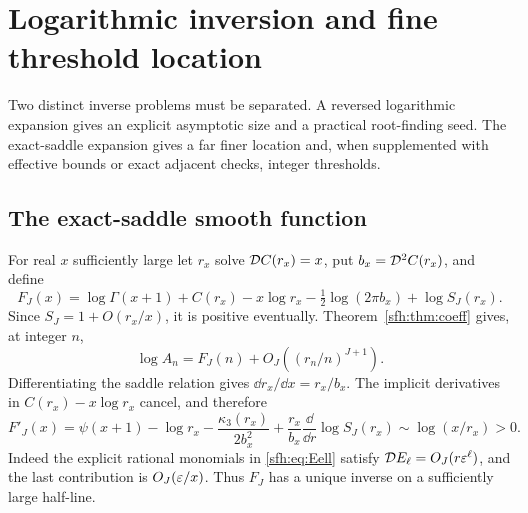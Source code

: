 \section{Logarithmic inversion and fine threshold location}\label{sfh:sec:inverse}
Two distinct inverse problems must be separated. A reversed logarithmic expansion gives an explicit asymptotic size and a practical root-finding seed. The exact-saddle expansion gives a far finer location and, when supplemented with effective bounds or exact adjacent checks, integer thresholds.

\subsection{The exact-saddle smooth function}
For real $x$ sufficiently large let $r_x$ solve $\mathcal D C(r_x)=x$, put $b_x=\mathcal D^2C(r_x)$, and define
\begin{equation}\label{sfh:eq:F}
 F_J(x)=\log\Gamma(x+1)+C(r_x)-x\log r_x
       -\tfrac12\log(2\pi b_x)+\log S_J(r_x).
\end{equation}
Since $S_J=1+O(r_x/x)$, it is positive eventually. Theorem~\ref{sfh:thm:coeff} gives, at integer $n$,
\begin{equation}\label{sfh:eq:logerror}
 \log A_n=F_J(n)+O_J((r_n/n)^{J+1}).
\end{equation}
Differentiating the saddle relation gives $\dd r_x/\dd x=r_x/b_x$. The implicit derivatives in $C(r_x)-x\log r_x$ cancel, and therefore
\begin{equation}\label{sfh:eq:Fprime}
 F'_J(x)=\psi(x+1)-\log r_x-\frac{\kappa_3(r_x)}{2b_x^2}
       +\frac{r_x}{b_x}\frac{\dd}{\dd r}\log S_J(r_x)
       \sim\log(x/r_x)>0.
\end{equation}
Indeed the explicit rational monomials in \eqref{sfh:eq:Eell} satisfy
$\mathcal D E_\ell=O_J(r\varepsilon^\ell)$, and the last contribution is $O_J(\varepsilon/x)$. Thus $F_J$ has a unique inverse on a sufficiently large half-line.

